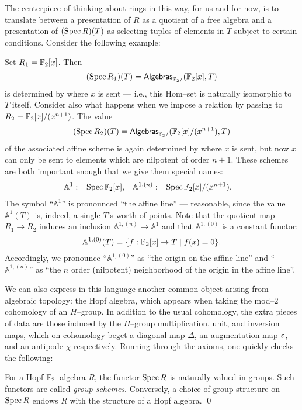 The centerpiece of thinking about rings in this way, for us and for now, is to translate between a presentation of $R$ as a quotient of a free algebra and a presentation of $(\operatorname{Spec} R)(T)$ as selecting tuples of elements in $T$ subject to certain conditions.  Consider the following example:
\begin{example}\label{FiniteOrderAffineSpaceDefn}
Set $R_1 = \mathbb F_2[x]$.  Then \[(\operatorname{Spec} R_1)(T) = \mathsf{Algebras}_{\mathbb F_2/}(\mathbb F_2[x], T)\] is determined by where $x$ is sent --- i.e., this Hom--set is naturally isomorphic to $T$ itself.  Consider also what happens when we impose a relation by passing to $R_2 = \mathbb F_2[x] / (x^{n+1})$.  The value \[(\operatorname{Spec} R_2)(T) = \mathsf{Algebras}_{\mathbb F_2/}(\mathbb F_2[x] / (x^{n+1}), T)\] of the associated affine scheme is again determined by where $x$ is sent, but now $x$ can only be sent to elements which are nilpotent of order $n+1$.  These schemes are both important enough that we give them special names:
\begin{align*}
\mathbb A^1 & := \operatorname{Spec} \mathbb F_2[x], & \mathbb A^{1, (n)} & := \operatorname{Spec} \mathbb F_2[x] / (x^{n+1}).
\end{align*}
The symbol ``$\mathbb A^1$'' is pronounced ``the affine line'' --- reasonable, since the value $\mathbb A^1(T)$ is, indeed, a single $T$'s worth of points.  Note that the quotient map $R_1 \to R_2$ induces an inclusion $\mathbb A^{1, (n)} \to \mathbb A^1$ and that $\mathbb A^{1, (0)}$ is a constant functor: \[\mathbb A^{1, (0)}(T) = \{f: \mathbb F_2[x] \to T \mid f(x) = 0\}.\]  Accordingly, we pronounce ``$\mathbb A^{1, (0)}$'' as ``the origin on the affine line'' and ``$\mathbb A^{1, (n)}$'' as ``the $n${\th} order (nilpotent) neighborhood of the origin in the affine line''.
\end{example}

We can also express in this language another common object arising from algebraic topology: the Hopf algebra, which appears when taking the mod--$2$ cohomology of an $H$--group.  In addition to the usual cohomology, the extra pieces of data are those induced by the $H$--group multiplication, unit, and inversion maps, which on cohomology beget a diagonal map $\Delta$, an augmentation map $\varepsilon$, and an antipode $\chi$ respectively.  Running through the axioms, one quickly checks the following:
\begin{lemma}
For a Hopf $\mathbb F_2$--algebra $R$, the functor $\operatorname{Spec} R$ is naturally valued in groups.  Such functors are called \textit{group schemes}.  Conversely, a choice of group structure on $\operatorname{Spec} R$ endows $R$ with the structure of a Hopf algebra.  \qed
\end{lemma}

